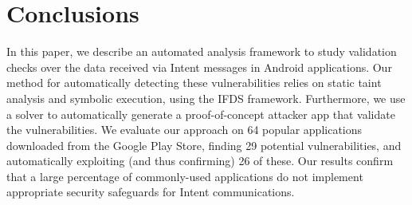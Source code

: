 \section{Conclusions}
\label{sec:concl}

In this paper, we describe an automated analysis framework to study validation checks over the data received via Intent messages in Android applications. Our method for automatically detecting these vulnerabilities relies on static taint analysis and symbolic execution, using the IFDS framework. Furthermore, we use a solver to automatically generate a  proof-of-concept attacker app that validate the vulnerabilities. We evaluate our approach on 64 popular applications downloaded from the Google Play Store, finding 29 potential vulnerabilities, and automatically exploiting (and thus confirming) 26 of these. Our results confirm that a large percentage of commonly-used applications do not implement appropriate security safeguards for Intent communications.